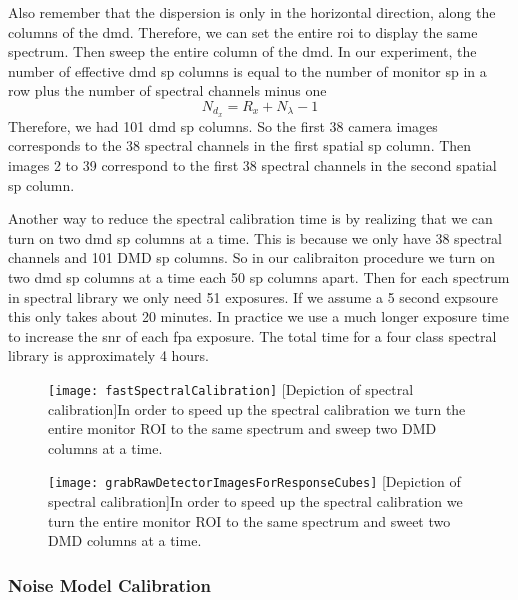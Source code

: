 Also remember that the dispersion is only in the horizontal direction, along the columns of the \gls{dmd}. Therefore, we can set the entire \gls{roi} to display the same spectrum. Then sweep the entire column of the \gls{dmd}. In our experiment, the number of effective \gls{dmd} \gls{sp} columns is equal to the number of monitor \gls{sp} in a row plus the number of spectral channels minus one 
%
\begin{equation}
	N_{d_x} = R_x + N_{\lambda} - 1
\end{equation}
%
Therefore, we had 101 \gls{dmd} \gls{sp} columns. So the first 38 camera images corresponds to the 38 spectral channels in the first spatial \gls{sp} column. Then images 2 to 39 correspond to the first 38 spectral channels in the second spatial \gls{sp} column. 

Another way to reduce the spectral calibration time is by realizing that we can turn on two \gls{dmd} \gls{sp} columns at a time. This is because we only have 38 spectral channels and 101 DMD \gls{sp} columns. So in our calibraiton procedure we turn on two \gls{dmd} \gls{sp} columns at a time each 50 \gls{sp} columns apart. Then for each spectrum in spectral library we only need 51 exposures. If we assume a 5 second expsoure this only takes about 20 minutes. In practice we use a much longer exposure time to increase the \gls{snr} of each \gls{fpa} exposure. The total time for a four class spectral library is approximately 4 hours.


\begin{figure}[h]
	\texttt{[image: fastSpectralCalibration]}
	\centering
	[Depiction of spectral calibration]{In order to speed up the spectral calibration we turn the entire monitor ROI to the same spectrum and sweep two DMD columns at a time.}
	\label{fig:fastSpectralCalibration}
\end{figure}

\clearpage
	\begin{figure}[H]
	\texttt{[image: grabRawDetectorImagesForResponseCubes]}
	\centering
	[Depiction of spectral calibration]{In order to speed up the spectral calibration we turn the entire monitor ROI to the same spectrum and sweet two DMD columns at a time.}
	\label{fig:grabRawDetectorImagesForResponseCubes}
\end{figure}


\subsubsection{Noise Model Calibration}

